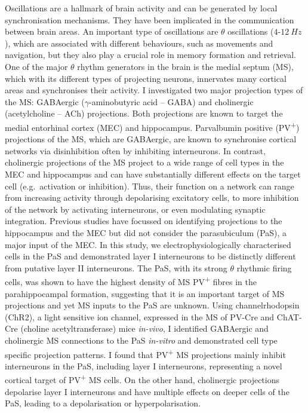\documentclass[
  12pt,
  a4paper,
  openany]{book}
\begin{document}
Oscillations are a hallmark of brain activity and can be generated by local synchronisation mechanisms. They have been implicated in the communication between brain areas.
An important type of oscillations are \(\theta\) oscillations (\(4\)-\(12\ Hz\)), which are associated with different behaviours, such as movements and navigation, but they also play a crucial role in memory formation and retrieval.
One of the major \(\theta\) rhythm generators in the brain is the medial septum (MS), which with its different types of projecting neurons, innervates many cortical areas and synchronises their activity.
I investigated two major projection types of the MS: GABAergic (\(\gamma\)-aminobutyric acid -- GABA) and cholinergic (acetylcholine -- ACh) projections.
Both projections are known to target the medial entorhinal cortex (MEC) and hippocampus.
Parvalbumin positive (PV\textsuperscript{+}) projections of the MS, which are GABAergic, are known to synchronise cortical networks via disinhibition often by inhibiting interneurons.
In contrast, cholinergic projections of the MS project to a wide range of cell types in the MEC and hippocampus and can have substantially different effects on the target cell (e.g.~activation or inhibition).
Thus, their function on a network can range from increasing activity through depolarising excitatory cells, to more inhibition of the network by activating interneurons, or even modulating synaptic integration.
Previous studies have focussed on identifying projections to the hippocampus and the MEC but did not consider the parasubiculum (PaS), a major input of the MEC. In this study, we electrophysiologically characterised cells in the PaS and demonstrated layer I interneurons to be distinctly different from putative layer II interneurons.
The PaS, with its strong \(\theta\) rhythmic firing cells, was shown to have the highest density of MS PV\textsuperscript{+} fibres in the parahippocampal formation, suggesting that it is an important target of MS projections and yet MS inputs to the PaS are unknown.
Using channelrhodopsin (ChR2), a light sensitive ion channel, expressed in the MS of PV-Cre and ChAT-Cre (choline acetyltransferase) mice \emph{in-vivo}, I identified GABAergic and cholinergic MS connections to the PaS \emph{in-vitro} and demonstrated cell type specific projection patterns.
I found that PV\textsuperscript{+} MS projections mainly inhibit interneurons in the PaS, including layer I interneurons, representing a novel cortical target of PV\textsuperscript{+} MS cells. On the other hand, cholinergic projections depolarise layer I interneurons and have multiple effects on deeper cells of the PaS, leading to a depolarisation or hyperpolarisation.
\end{document}
